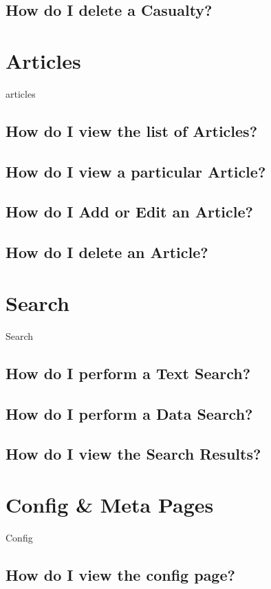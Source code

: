 \documentclass[12pt]{article}
\begin{document}
\subsection{How do I delete a Casualty?}


\section{Articles}\label{sec:articles}
articles
\subsection{How do I view the list of Articles?}
\subsection{How do I view a particular Article?}
\subsection{How do I Add or Edit an Article?}
\subsection{How do I delete an Article?}

\section{Search}\label{sec:search}
Search
\subsection{How do I perform a Text Search?}
\subsection{How do I perform a Data Search?}
\subsection{How do I view the Search Results?}

\section{Config \& Meta Pages}\label{sec:config}
Config
\subsection{How do I view the config page?}\label{ssec:config}
\end{document}
